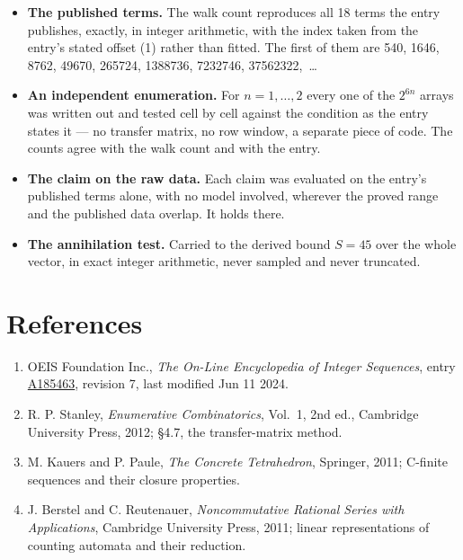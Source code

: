 \documentclass[11pt]{article}
\theoremstyle{definition}
\begin{document}
\begin{itemize}

\item {\bfseries The published terms.} The walk count reproduces all 18 terms the entry publishes, exactly, in integer arithmetic, with the index taken from the entry's stated offset (1) rather than fitted. The first of them are 540, 1646, 8762, 49670, 265724, 1388736, 7232746, 37562322,~\dots

\item {\bfseries An independent enumeration.} For $n = 1,\dots,2$ every one of the $2^{6n}$ arrays was written out and tested cell by cell against the condition as the entry states it --- no transfer matrix, no row window, a separate piece of code. The counts agree with the walk count and with the entry.

\item {\bfseries The claim on the raw data.} Each claim was evaluated on the entry's published terms alone, with no model involved, wherever the proved range and the published data overlap. It holds there.

\item {\bfseries The annihilation test.} Carried to the derived bound $S = 45$ over the whole vector, in exact integer arithmetic, never sampled and never truncated.

\end{itemize}

\section{References}

\begin{enumerate}

\item OEIS Foundation Inc., \emph{The On-Line Encyclopedia of Integer Sequences}, entry \href{https://oeis.org/A185463}{A185463}, revision 7, last modified Jun 11 2024.

\item R. P. Stanley, \emph{Enumerative Combinatorics}, Vol.~1, 2nd ed., Cambridge University Press, 2012; \S4.7, the transfer-matrix method.

\item M. Kauers and P. Paule, \emph{The Concrete Tetrahedron}, Springer, 2011; C-finite sequences and their closure properties.

\item J. Berstel and C. Reutenauer, \emph{Noncommutative Rational Series with Applications}, Cambridge University Press, 2011; linear representations of counting automata and their reduction.

\end{enumerate}
\end{document}
